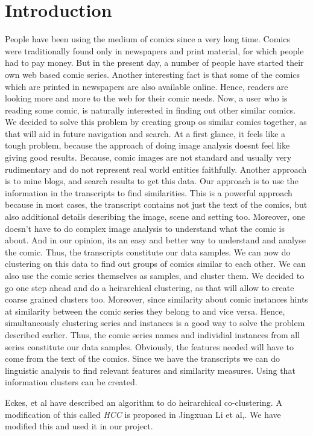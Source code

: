 \documentclass[11pt,twocolumn]{article}
\begin{document}
\section{Introduction}
People have been using the medium of comics since a very long time. Comics were traditionally found only in newspapers and print material, for which people had to pay money. But in the present day, a number of people have started their own web based comic series. Another interesting fact is that some of the comics which are printed in newspapers are also available online. Hence, readers are looking more and more to the web for their comic needs. Now, a user who is reading some comic, is naturally interested in finding out other similar comics. We decided to solve this problem by creating group os similar comics together, as that will aid in future navigation and search. At a first glance, it feels like a tough problem, because the approach of doing image analysis doesnt feel like giving good results. Because, comic images are not standard and usually very rudimentary and do not represent real world entities faithfully. Another approach is to mine blogs, and search results to get this data. Our approach is to use the information in the transcripts to find similarities. This is a powerful approach because in most cases, the transcript contains not just the text of the comics, but also additional details describing the image, scene and setting too. Moreover, one doesn't have to do complex image analysis to understand what the comic is about. And in our opinion, its an easy and better way to understand and analyse the comic. Thus, the transcripts constitute our data samples. We can now do clustering on this data to find out groups of comics similar to each other. We can also use the comic series themselves as samples, and cluster them.  We decided to go one step ahead and do a heirarchical clustering, as that will allow to create coarse grained clusters too. Moreover, since similarity about comic instances hints at similarity between the comic series they belong to and vice versa. Hence, simultaneously clustering series and instances is a good way to solve the problem described earlier. Thus, the comic series names and individial instances from all series constitute our data samples. Obviously, the features needed will have to come from the text of the comics. Since we have the transcripts we can do linguistic analysis to find relevant features and similarity measures. Using that information clusters can be created.

Eckes, et al\cite{HCC2} have described an algorithm to do heirarchical co-clustering. A modification of this called \emph{HCC} is proposed in Jingxuan Li et al,\cite{HCC1}. We have modified this and used it in our project.
\end{document}
